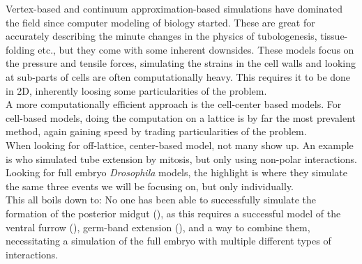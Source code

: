 Vertex-based and continuum approximation-based simulations have dominated the field since computer modeling of biology started. These are great for accurately describing the minute changes in the physics of tubologenesis, tissue-folding etc., but they come with some inherent downsides. These models focus on the pressure and tensile forces, simulating the strains in the cell walls and looking at sub-parts of cells are often computationally heavy. This requires it to be done in 2D\cite{krajnc2018fluidization}, inherently loosing some particularities of the problem.\\ A more computationally efficient approach is the cell-center based models. For cell-based models, doing the computation on a lattice is by far the most prevalent method, again gaining speed by trading particularities of the problem.\\   

When looking for off-lattice, center-based model, not many show up. An example is  who simulated tube extension by mitosis, but only using non-polar interactions. Looking for full embryo \textit{Drosophila} models, the highlight is  where they simulate the same three events we will be focusing on, but only individually.\\

This all boils down to: No one has been able to successfully simulate the formation of the posterior midgut (), as this requires a successful model of the ventral furrow (), germ-band extension (), and a way to combine them, necessitating a simulation of the full embryo with multiple different types of interactions.\\



% 






